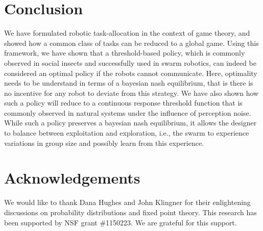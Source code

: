 \documentclass[conference]{ieeeconf}
\begin{document}
\section{Conclusion}\label{sec:conc}
We have formulated robotic task-allocation in the context of game theory, and showed how a common class of tasks can be reduced to a global game. Using this framework, we have shown that a threshold-based policy, which is commonly observed in social insects and successfully used in swarm robotics, can indeed be considered an optimal policy if the robots cannot communicate. Here, optimality needs to be understand in terms of a bayesian nash equilibrium, that is there is no incentive for any robot to deviate from this strategy.
We have also shown how such a policy will reduce to a continuous response threshold function that is commonly observed in natural systems under the influence of perception noise. While such a policy preserves a bayesian nash equilibrium, it allows the designer to balance between exploitation and exploration, i.e., the swarm to experience variations in group size and possibly learn from this experience. 

\section*{Acknowledgements}
We would like to thank Dana Hughes and John Klingner for their enlightening discussions on probability distributions and fixed point theory. This research has been supported by NSF grant \#1150223. We are grateful for this support.


\end{document}
